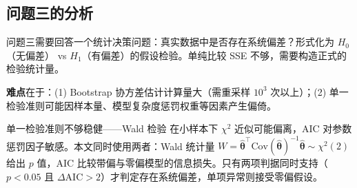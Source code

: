 \subsection{问题三的分析}

问题三需要回答一个统计决策问题：真实数据中是否存在系统偏差？形式化为 $H_0$（无偏差） vs $H_1$（有偏差）的假设检验。单纯比较 SSE 不够，需要构造正式的检验统计量。

\textbf{难点}在于：(1) Bootstrap 协方差估计计算量大（需重采样 $10^3$ 次以上）；(2) 单一检验准则可能因样本量、模型复杂度惩罚权重等因素产生偏倚。

单一检验准则不够稳健——Wald 检验 \cite{wald1943} 在小样本下 $\chi^2$ 近似可能偏离，AIC \cite{akaike1974} 对参数惩罚因子敏感。本文同时使用两者：Wald 统计量 $W = \hat{\boldsymbol{\theta}}^\top \text{Cov}(\hat{\boldsymbol{\theta}})^{-1} \hat{\boldsymbol{\theta}} \sim \chi^2(2)$ 给出 $p$ 值，AIC 比较带偏与零偏模型的信息损失。只有两项判据同时支持（$p<0.05$ 且 $\Delta\text{AIC} > 2$）才判定存在系统偏差，单项异常则接受零偏假设。

